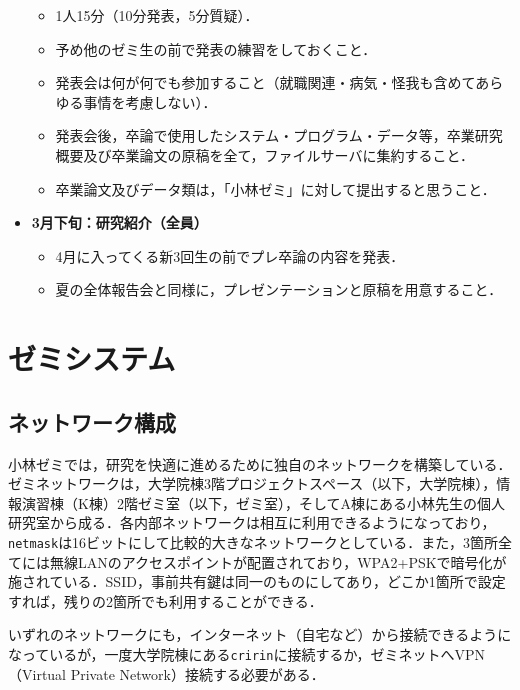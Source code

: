 \documentclass[11pt]{jarticle}
\begin{document}
\begin{breakbox}
\begin{itemize}
\begin{itemize}
		\item 1人15分（10分発表，5分質疑）．
		\item 予め他のゼミ生の前で発表の練習をしておくこと．
		\item 発表会は何が何でも参加すること（就職関連・病気・怪我も含めてあらゆる事情を考慮しない）．
		\item 発表会後，卒論で使用したシステム・プログラム・データ等，卒業研究概要及び卒業論文の原稿を全て，ファイルサーバに集約すること．
		\item 卒業論文及びデータ類は，「小林ゼミ」に対して提出すると思うこと．
		\end{itemize}
	\item {\bf 3月下旬：研究紹介（全員）}
		\begin{itemize}
		\item 4月に入ってくる新3回生の前でプレ卒論の内容を発表．
		\item 夏の全体報告会と同様に，プレゼンテーションと原稿を用意すること．
		\end{itemize}
	\end{itemize}
\end{breakbox}


\section{ゼミシステム}
\subsection{ネットワーク構成}
小林ゼミでは，研究を快適に進めるために独自のネットワークを構築している．ゼミネットワークは，大学院棟3階プロジェクトスペース（以下，大学院棟），情報演習棟（K棟）2階ゼミ室（以下，ゼミ室），そしてA棟にある小林先生の個人研究室から成る．各内部ネットワークは相互に利用できるようになっており，\verb|netmask|は16ビットにして比較的大きなネットワークとしている．また，3箇所全てには無線LANのアクセスポイントが配置されており，WPA2+PSKで暗号化が施されている．SSID，事前共有鍵は同一のものにしてあり，どこか1箇所で設定すれば，残りの2箇所でも利用することができる．




いずれのネットワークにも，インターネット（自宅など）から接続できるようになっているが，一度大学院棟にある\verb|cririn|に接続するか，ゼミネットへVPN（Virtual Private Network）接続する必要がある．
\end{document}
